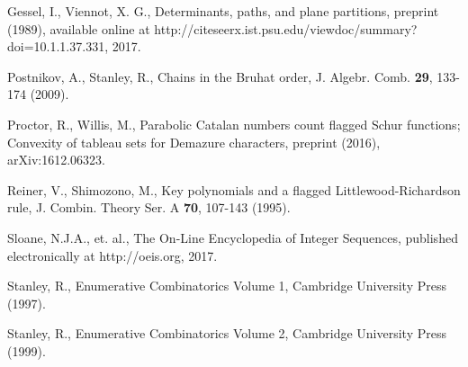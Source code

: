 \documentclass[11pt]{article}
\theoremstyle{definition}
\theoremstyle{remark}
\numberwithin{equation}{section}
\begin{document}
\begin{spacing}{1.35}
\begin{thebibliography}{99}







Gessel, I., Viennot, X. G., Determinants, paths, and plane partitions, preprint (1989), available online at http://citeseerx.ist.psu.edu/viewdoc/summary?doi=10.1.1.37.331, 2017.

Postnikov, A., Stanley, R., Chains in the Bruhat order, J. Algebr. Comb. \textbf{29}, 133-174 (2009).


Proctor, R., Willis, M., Parabolic Catalan numbers count flagged Schur functions; Convexity of tableau sets for Demazure characters, preprint (2016), arXiv:1612.06323.

Reiner, V., Shimozono, M., Key polynomials and a flagged {L}ittlewood-{R}ichardson rule, J. Combin. Theory Ser. A \textbf{70}, 107-143 (1995).

Sloane, N.J.A., et. al., The On-Line Encyclopedia of Integer Sequences, published electronically at http://oeis.org, 2017.

Stanley, R., Enumerative Combinatorics Volume 1, Cambridge University Press (1997).

Stanley, R., Enumerative Combinatorics Volume 2, Cambridge University Press (1999).

\end{thebibliography}

\end{spacing}
\end{document}
